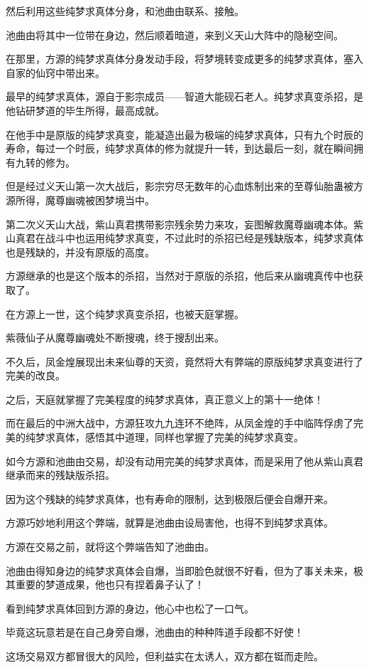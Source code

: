 \begin{this_body}
然后利用这些纯梦求真体分身，和池曲由联系、接触。

池曲由将其中一位带在身边，然后顺着暗道，来到义天山大阵中的隐秘空间。

在那里，方源的纯梦求真体分身发动手段，将梦境转变成更多的纯梦求真体，塞入自家的仙窍中带出来。

最早的纯梦求真体，源自于影宗成员——智道大能砚石老人。纯梦求真变杀招，是他钻研梦道的毕生所得，最高成就。

在他手中是原版的纯梦求真变，能凝造出最为极端的纯梦求真体，只有九个时辰的寿命，每过一个时辰，纯梦求真体的修为就提升一转，到达最后一刻，就在瞬间拥有九转的修为。

但是经过义天山第一次大战后，影宗穷尽无数年的心血炼制出来的至尊仙胎蛊被方源所得，魔尊幽魂被困梦境当中。

第二次义天山大战，紫山真君携带影宗残余势力来攻，妄图解救魔尊幽魂本体。紫山真君在战斗中也运用纯梦求真变，不过此时的杀招已经是残缺版本，纯梦求真体也是残缺的，并没有原版的高度。

方源继承的也是这个版本的杀招，当然对于原版的杀招，他后来从幽魂真传中也获取了。

在方源上一世，这个纯梦求真变杀招，也被天庭掌握。

紫薇仙子从魔尊幽魂处不断搜魂，终于搜刮出来。

不久后，凤金煌展现出未来仙尊的天资，竟然将大有弊端的原版纯梦求真变进行了完美的改良。

之后，天庭就掌握了完美程度的纯梦求真体，真正意义上的第十一绝体！

而在最后的中洲大战中，方源狂攻九九连环不绝阵，从凤金煌的手中临阵俘虏了完美的纯梦求真体，感悟其中道理，同样也掌握了完美的纯梦求真变。

如今方源和池曲由交易，却没有动用完美的纯梦求真体，而是采用了他从紫山真君继承而来的残缺版杀招。

因为这个残缺的纯梦求真体，也有寿命的限制，达到极限后便会自爆开来。

方源巧妙地利用这个弊端，就算是池曲由设局害他，也得不到纯梦求真体。

方源在交易之前，就将这个弊端告知了池曲由。

池曲由得知身边的纯梦求真体会自爆，当即脸色就很不好看，但为了事关未来，极其重要的梦道成果，他也只有捏着鼻子认了！

看到纯梦求真体回到方源的身边，他心中也松了一口气。

毕竟这玩意若是在自己身旁自爆，池曲由的种种阵道手段都不好使！

这场交易双方都冒很大的风险，但利益实在太诱人，双方都在铤而走险。


\end{this_body}
